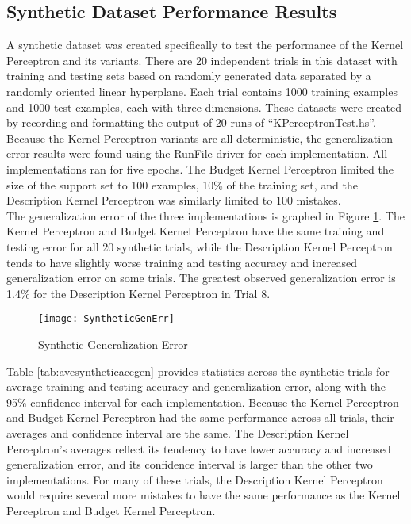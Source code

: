 \subsection{Synthetic Dataset Performance Results}\label{SyntheticResults}
A synthetic dataset was created specifically to test the performance of the Kernel Perceptron and its variants. There are 20 independent trials in this dataset with training and testing sets based on randomly generated data separated by a randomly oriented linear hyperplane. Each trial contains 1000 training examples and 1000 test examples, each with three dimensions. These datasets were created by recording and formatting the output of 20 runs of ``KPerceptronTest.hs''. 
\\Because the Kernel Perceptron variants are all deterministic, the generalization error results were found using the RunFile driver for each implementation. All implementations ran for five epochs. The Budget Kernel Perceptron limited the size of the support set to 100 examples, 10\% of the training set, and the Description Kernel Perceptron was similarly limited to 100 mistakes. 
\\The generalization error of the three implementations is graphed in Figure \ref{SyntheticGenErrFig}. The Kernel Perceptron and Budget Kernel Perceptron have the same training and testing error for all 20 synthetic trials, while the Description Kernel Perceptron tends to have slightly worse training and testing accuracy and increased generalization error on some trials. The greatest observed generalization error is 1.4\% for the Description Kernel Perceptron in Trial 8.

\begin{figure}[p]
 \caption{Synthetic Generalization Error}
 \label{SyntheticGenErrFig}
 \begin{center}
  \texttt{[image: SyntheticGenErr]}
 \end{center}
\end{figure}

Table \ref{tab:avesyntheticaccgen} provides statistics across the synthetic trials for average training and testing accuracy and generalization error, along with the 95\% confidence interval for each implementation. Because the Kernel Perceptron and Budget Kernel Perceptron had the same performance across all trials, their averages and confidence interval are the same. The Description Kernel Perceptron's averages reflect its tendency to have lower accuracy and increased generalization error, and its confidence interval is larger than the other two implementations. For many of these trials, the Description Kernel Perceptron would require several more mistakes to have the same performance as the Kernel Perceptron and Budget Kernel Perceptron.

